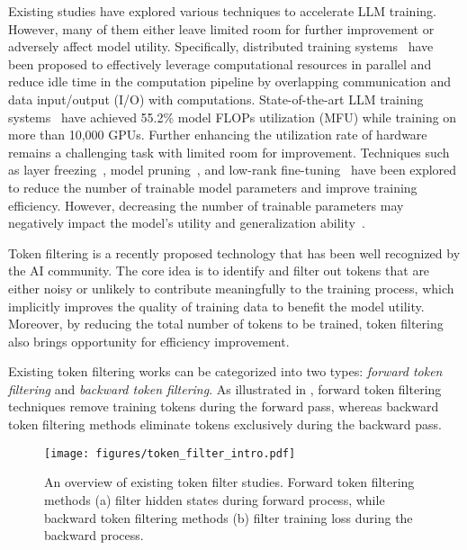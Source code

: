 Existing studies have explored various techniques to accelerate LLM training. However, many of them either leave limited room for further improvement or adversely affect model utility. Specifically, distributed training systems~\cite{MegatronLM,MegaScale} have been proposed to effectively leverage computational resources in parallel and reduce idle time in the computation pipeline by overlapping communication and data input/output (I/O) with computations. State-of-the-art LLM training systems~\cite{MegaScale} have achieved 55.2\% model FLOPs utilization (MFU) while training on more than 10,000 GPUs. Further enhancing the utilization rate of hardware remains a challenging task with limited room for improvement.
Techniques such as layer freezing~\cite{SmartFRZ,yiding-layer-freezing}, model pruning~\cite{DBLP:conf/nips/MaFW23,DBLP:conf/iclr/Sun0BK24}, and low-rank fine-tuning~\cite{LoRA} have been explored to reduce the number of trainable model parameters and improve training efficiency. However, decreasing the number of trainable parameters may negatively impact the model's utility and generalization ability~\cite{DBLP:journals/natmi/DingQYWYSHCCCYZWLZCLTLS23}.

Token filtering is a recently proposed technology that has been well recognized by the AI community. The core idea is to identify and filter out tokens that are either noisy or unlikely to contribute meaningfully to the training process, which implicitly improves the quality of training data to benefit the model utility. Moreover, by reducing the total number of tokens to be trained, token filtering also brings opportunity for efficiency improvement.

Existing token filtering works can be categorized into two types: \emph{forward token filtering} and \emph{backward token filtering}. As illustrated in , forward token filtering techniques remove training tokens during the forward pass, whereas backward token filtering methods eliminate tokens exclusively during the backward pass.

\begin{figure}[t]
	\centering
	\texttt{[image: figures/token\_filter\_intro.pdf]}
	\caption{An overview of existing token filter studies. Forward token filtering methods (a) filter hidden states during forward process, while backward token filtering methods (b) filter training loss during the backward process.}
	\label{fig:token_filter_intro}
    \vspace{+2mm}
\end{figure}

